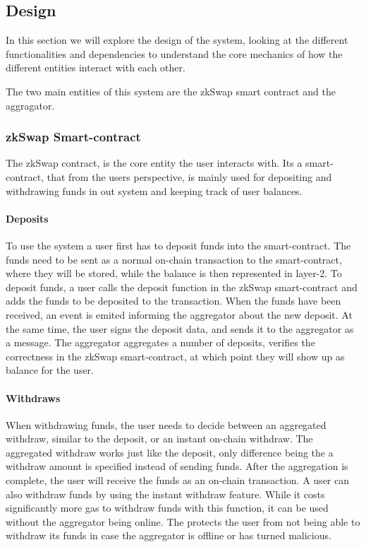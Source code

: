 \documentclass[../../thesis.tex]{subfiles}
\begin{document}
\subsection{Design}
In this section we will explore the design of the system, looking at the different functionalities and dependencies to understand the core mechanics of how the different entities interact with each other. 

The two main entities of this system are the zkSwap smart contract and the aggragator. 


\subsubsection{zkSwap Smart-contract}
The zkSwap contract, is the core entity the user interacts with. Its a smart-contract, that from the users perspective, is mainly used for depositing and withdrawing funds in out system and keeping track of user balances.

\paragraph{Deposits}
To use the system a user first has to deposit funds into the smart-contract. The funds need to be sent as a normal on-chain transaction to the smart-contract, where they will be stored, while the balance is then represented in layer-2. To deposit funds, a user calls the deposit function in the zkSwap smart-contract and adds the funds to be deposited to the transaction. When the funds have been received, an event is emited informing the aggregator about the new deposit. At the same time, the user signs the deposit data, and sends it to the aggregator as a message. The aggregator aggregates a number of deposits, verifies the correctness in the zkSwap smart-contract, at which point they will show up as balance for the user.

\paragraph{Withdraws}
When withdrawing funds, the user needs to decide between an aggregated withdraw, similar to the deposit, or an instant on-chain withdraw. The aggregated withdraw works just like the deposit, only difference being the a withdraw amount is specified instead of sending funds. After the aggregation is complete, the user will receive the funds as an on-chain transaction. A user can also withdraw funds by using the instant withdraw feature. While it costs significantly more gas to withdraw funds with this function, it can be used without the aggregator being online. The protects the user from not being able to withdraw its funds in case the aggregator is offline or has turned malicious. 
\end{document}
